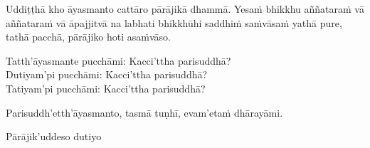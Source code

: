 \medskip

\begin{center}
Uddiṭṭhā kho āyasmanto cattāro pārājikā dhammā. Yesaṁ bhikkhu aññataraṁ vā aññataraṁ vā āpajjitvā na labhati bhikkhūhi saddhiṁ saṁvāsaṁ yathā pure, tathā pacchā, pārājiko hoti asaṁvāso.

\smallskip

Tatth'āyasmante pucchāmi: Kacci'ttha parisuddhā?\\
Dutiyam'pi pucchāmi: Kacci'ttha parisuddhā?\\
Tatiyam'pi pucchāmi: Kacci'ttha parisuddhā?

\smallskip

Parisuddh'etth'āyasmanto, tasmā tuṇhī, evam'etaṁ dhārayāmi.
\end{center}

\begin{outro}
Pārājik'uddeso dutiyo 
\end{outro}

\clearpage

